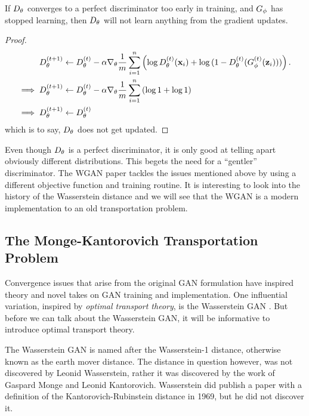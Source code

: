 \begin{theorem} If $D_\theta$ converges to a perfect discriminator too early
  in training, and $G_\phi$ has stopped learning, then $D_\theta$ will not learn
  anything from the gradient updates.
\end{theorem}

\begin{proof}
  \begin{align}
    \label{eq:d-updates-no-good}
    D_\theta^{(t+1)} & \gets D_\theta^{(t)} - \alpha\nabla_\theta {1 \over m}
                 \sum_{i=1}^n \left( \log D^{(t)}_\theta(\mathbf{x}_i)
                 + \log{(1 -
                 D^{(t)}_\theta(G^{(t)}_\phi(\mathbf{z}_i)))}
                 \right). \\
    \implies D_\theta^{(t+1)} & \gets D_\theta^{(t)} - \alpha\nabla_\theta {1
                          \over m} \sum_{i=1}^n \left( \log{1} + \log{1} \right) \\
    \implies D_\theta^{(t+1)} & \gets D_\theta^{(t)}
  \end{align} which is to say, $D_\theta$ does not get updated.
\end{proof}

Even though $D_\theta$ is a perfect discriminator, it is only good at
telling apart obviously different distributions. This begets the need
for a ``gentler'' discriminator.  The WGAN paper tackles the issues
mentioned above by using a different objective function and training
routine.  It is interesting to look into the history of the
Wasserstein distance and we will see that the WGAN is a modern
implementation to an old transportation problem.

\subsection{The Monge-Kantorovich Transportation Problem}

Convergence issues that arise from the original GAN formulation have
inspired theory and novel takes on GAN training and
implementation. One influential variation, inspired by \textit{optimal
  transport theory}, is the Wasserstein GAN
\cite{ref:arjovsky-2017}. But before we can talk about the Wasserstein
GAN, it will be informative to introduce optimal transport theory.

The Wasserstein GAN is named after the Wasserstein-1 distance,
otherwise known as the earth mover distance. The distance in question
however, was not discovered by Leonid Wasserstein, rather it was
discovered by the work of Gaspard Monge and Leonid
Kantorovich. Wasserstein did publish a paper with a definition of the
Kantorovich-Rubinstein distance in 1969, but he did not discover it.

